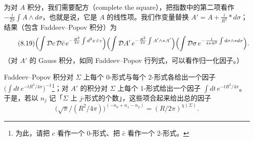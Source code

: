 
为对 $A$ 积分，我们需要配方（complete the square），把指数中的第二项看作 $-\frac{i}{2\pi}\int A\wedge d\sigma$，也就是说，它是 $A$ 的线性项。我们作变量替换 $A'=A+\frac{i}{R^2}\ast d\sigma$；结果（包含 Faddeev–Popov 积分）为
\begin{equation}
  \tag{8.19}
  \label{eq:8-19}
  \Bigl(\int\mathcal{D}c\,\mathcal{D}\bar c\,e^{-\frac{R^2}{4\pi}\int d^2x\,\bar c\,c}\Bigr)
  \Bigl(\int\mathcal{D}A'\,e^{-\frac{R^2}{4\pi}\int A'\wedge\ast A'}\Bigr)
  \Bigl(\int\mathcal{D}\sigma\,e^{-\frac{1}{4\pi R^2}\int d\sigma\wedge\ast d\sigma}\Bigr).
\end{equation}
（对 $A'$ 的 Gauss 积分，如同 Faddeev–Popov 行列式，可以看作归一化因子。）


Faddeev–Popov 积分对 $\Sigma$ 上每个 0-形式与每个 2-形式各给出一个因子 $\bigl(\int dt\,e^{-tR^2/4\pi}\bigr)^{-1}$\footnote{为此，请把 $c$ 看作一个 0-形式、把 $\bar c$ 看作一个 2-形式。}；对 $A'$ 的积分对 $\Sigma$ 上每个 1-形式给出一个因子 $\int dt\,e^{-tR^2/4\pi}$。于是，若以 $n_j$ 记「$\Sigma$ 上 $j$-形式的个数」，这些项合起来给出总的因子
\begin{equation}
  \tag{8.20}
  \label{eq:8-20}
  \bigl(\sqrt{\pi}/(R^2/4\pi)\bigr)^{(-n_0+n_1-n_2)}=(R/2\pi)^{\chi(\Sigma)}.
\end{equation}

